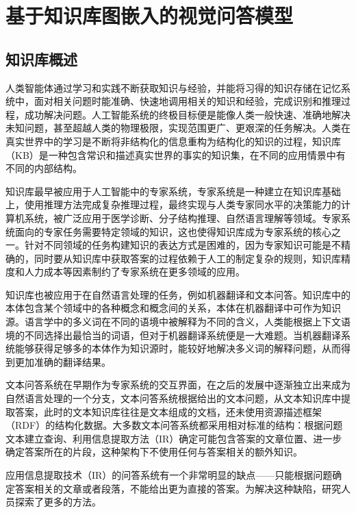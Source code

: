 \chapter{基于知识库图嵌入的视觉问答模型}
\section{知识库概述}
人类智能体通过学习和实践不断获取知识与经验，并能将习得的知识存储在记忆系统中，面对相关问题时能准确、快速地调用相关的知识和经验，完成识别和推理过程，成功解决问题。人工智能系统的终极目标便是能像人类一般快速、准确地解决未知问题，甚至超越人类的物理极限，实现范围更广、更艰深的任务解决。人类在真实世界中的学习是不断将非结构化的信息重构为结构化的知识的过程，知识库（KB）是一种包含常识和描述真实世界的事实的知识集，在不同的应用情景中有不同的内部结构。

知识库最早被应用于人工智能中的专家系统，专家系统是一种建立在知识库基础上，使用推理方法完成复杂推理过程，最终实现与人类专家同水平的决策能力的计算机系统，被广泛应用于医学诊断、分子结构推理、自然语言理解等领域。专家系统面向的专家任务需要特定领域的知识，这也使得知识库成为专家系统的核心之一。针对不同领域的任务构建知识的表达方式是困难的，因为专家知识可能是不精确的，同时要从知识库中获取答案的过程依赖于人工的制定复杂的规则，知识库精度和人力成本等因素制约了专家系统在更多领域的应用。

知识库也被应用于在自然语言处理的任务，例如机器翻译和文本问答。知识库中的本体包含某个领域中的各种概念和概念间的关系，本体在机器翻译中可作为知识源。语言学中的多义词在不同的语境中被解释为不同的含义，人类能根据上下文语境的不同选择出最恰当的词语，但对于机器翻译系统便是一大难题。当机器翻译系统能够获得足够多的本体作为知识源时，能较好地解决多义词的解释问题，从而得到更加准确的翻译结果。

文本问答系统在早期作为专家系统的交互界面，在之后的发展中逐渐独立出来成为自然语言处理的一个分支，文本问答系统根据给出的文本问题，从文本知识库中提取答案，此时的文本知识库往往是文本组成的文档，还未使用资源描述框架（RDF）的结构化数据。大多数文本问答系统都采用相对标准的结构：根据问题文本建立查询、利用信息提取方法（IR）确定可能包含答案的文章位置、进一步确定答案所在的片段，这种架构下不使用任何与答案相关的额外知识。

应用信息提取技术（IR）的问答系统有一个非常明显的缺点——只能根据问题确定答案相关的文章或者段落，不能给出更为直接的答案。为解决这种缺陷，研究人员探索了更多的方法。

